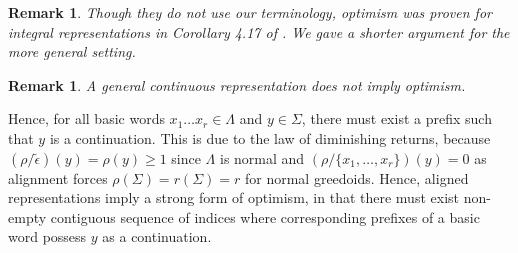 \documentclass[11pt]{article}
\newtheorem{remark}[theorem]{Remark}
\newcommand{\univ}{\Sigma}
\newcommand{\glang}{\Lambda}
\begin{document}

\begin{remark}
    Though they do not use our terminology, optimism was proven for integral representations in Corollary 4.17 of \cite{korte1985polymatroid}.
    We gave a shorter argument for the more general setting.
\end{remark}
\begin{remark}
    A general continuous representation does not imply optimism.
\end{remark}
\iffalse
Hence, for all basic words $x_1\ldots x_r \in\glang$ and $y \in \univ$, there must exist a prefix such that $y$ is a continuation.
This is due to the law of diminishing returns, because $(\rho/\widetilde{\epsilon})(y) = \rho(y) \geq 1$ since $\glang$ is normal and $(\rho/\{x_1,\ldots,x_r\})(y) = 0$ as alignment forces $\rho(\univ) = r(\univ) = r$ for normal greedoids.
Hence, aligned representations imply a strong form of optimism, in that there must exist non-empty contiguous sequence of indices where corresponding prefixes of a basic word possess $y$ as a continuation.
\end{document}
